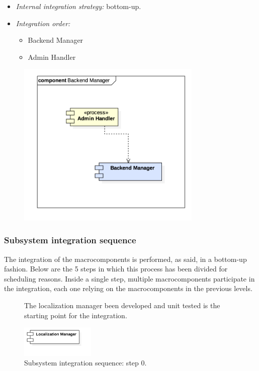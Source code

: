 			\begin{itemize}[label={},leftmargin=*,noitemsep,topsep=0pt]
				\item \textit{Internal integration strategy:} bottom-up.
				\item \textit{Integration order:}
					\begin{itemize}[noitemsep]
						\item Backend Manager
						\item Admin Handler
					\end{itemize}
			\end{itemize}
			\begin{figure}[h]
				\includegraphics[width=250pt, center]{img/integration_strategy/subcomponents/backend_manager.png}
			\end{figure}
		\FloatBarrier

	\subsubsection{Subsystem integration sequence}
	\label{sec:subsystem_integration_sequence}
		The integration of the macrocomponents is performed, as said, in a bottom-up fashion. Below are the 5 steps in which this process has been divided for scheduling reasons. Inside a single step, multiple macrocomponents participate in the integration, each one relying on the macrocomponents in the previous levels.

		\begin{figure}[h]
			The localization manager been developed and unit tested is the starting point for the integration.
			\par\bigskip
			\includegraphics[width=100pt,center]{img/integration_strategy/steps/high_level_components_lv0.png}
			\caption{Subsystem integration sequence: step 0.}
		\end{figure}
		\FloatBarrier

